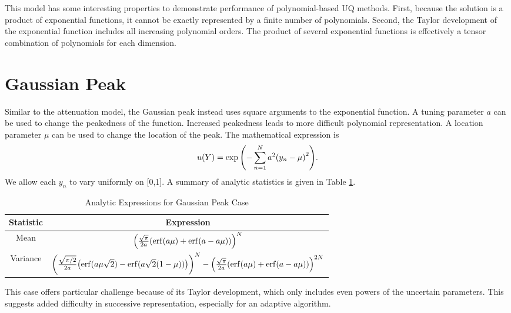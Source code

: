 This model has some interesting properties to demonstrate performance of polynomial-based UQ methods.  First,
because the solution is a product of exponential functions, it cannot be exactly represented by a finite
number of polynomials.  Second, the Taylor development of the exponential function includes all increasing
polynomial orders.  The product of several exponential functions is effectively a tensor combination of
polynomials for each dimension.

\section{Gaussian Peak}\label{mod:gausspeak}
Similar to the attenuation model, the Gaussian peak \cite{sfugenz} instead uses square arguments to the
exponential function.  A tuning parameter $a$ can be used to change the peakedness of the
function.  Increased peakedness leads to more difficult polynomial representation.  
A location parameter $\mu$ can be used to change the location of the peak.
The mathematical expression is
\begin{equation}
  u(Y) = \exp\qty(-\sum_{n=1}^N a^2\qty(y_n-\mu)^2).
\end{equation}
We allow each $y_n$ to vary uniformly on [0,1].
A summary of analytic statistics is given in Table \ref{tab:gausspeak moments}.

\begin{table}[H]
  \centering
  \begin{tabular}{c|c}
    Statistic & Expression \\ \hline
    Mean & $\qty(\frac{\sqrt{\pi}}{2a}\qty(\erf(a\mu)+\erf(a-a\mu)))^N$ \\
    Variance & $\qty(\frac{\sqrt{\pi/2}}{2a}\qty(\erf(a\mu\sqrt{2})-\erf(a\sqrt{2}(1-\mu))))^N - \qty(\frac{\sqrt{\pi}}{2a}\qty(\erf(a\mu)+\erf(a-a\mu)))^{2N}$
  \end{tabular}
  \caption{Analytic Expressions for Gaussian Peak Case}
  \label{tab:gausspeak moments}
\end{table}
This case offers particular challenge because of its Taylor development, which only includes even powers of
the uncertain parameters.  This suggests added difficulty in successive representation, especially for an
adaptive algorithm.


